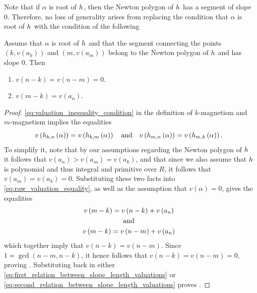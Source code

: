 \documentclass[../main.tex]{subfiles}
\begin{document}
  Note that if $\alpha$ is \aredex root of $h_{}$, then the Newton polygon of $h_{}$ has a segment of slope $0$.
  Therefore, no loss of generality arises from replacing the condition that $\alpha$ is \anex root of $h_{}$ with the condition of the following
  \begin{lemma}
    \label{lem:slope_length_valuation}
    Assume that $\alpha$ is \aredex root of $h_{}$ and that the segment connecting the points $\left( k, v\left( a_k \right) \right)$ and $\left( m, v\left( a_m \right) \right)$ belong to the Newton polygon of $h_{}$ and has slope $0$.
    Then
    \begin{enumerate}
      \item \label{item:smaller_slope_length_valuation} 
      $v\left( n - k \right) = v\left( n - m \right) = 0$.
      \item \label{item:bigger_slope_length_valuation} 
      $v\left( m - k \right) 
        = 
        v\left( a_n \right)
        .$
    \end{enumerate}
  \end{lemma}
  \begin{proof}
    \cref{eq:valuation_inequality_condition} in the definition of $k$-magnetism and $ m $-magnetism implies the equalities 
    \begin{equation}
      \label{eq:raw_valuation_equality}
      v\left( h_{k,n}\left( \alpha \right) \right) = 
      v\left( h_{k,m}\left( \alpha \right) \right)
      \quad \text{and} \quad
      v\left( h_{m,n}\left( \alpha \right) \right) = 
      v\left( h_{m,k}\left( \alpha \right) \right)
      .
    \end{equation}
    To simplify it, note that by our assumptions regarding the Newton polygon of $h_{}$ it follows that $v\left( a_n \right) > v\left( a_m \right) = v\left( a_k \right)$, and that since we also assume that $h_{}$ is \aredex polynomial and thus integral and primitive over $R$, it follows that $v\left( a_m \right) = v\left( a_k \right) = 0$. 
    Substituting these two facts into \cref{eq:raw_valuation_equality}, as well as the assumption that $v\left( \alpha \right) = 0$, gives the equalities
    \begin{gather}
      v\left( m - k \right) = v\left( n - k \right) + v\left( a_n \right) 
      \label{eq:first_relation_between_slope_length_valuations}
      \\
      \notag
      \text{ and } 
      \\
      v\left( m - k \right) = v\left( n - m \right) + v\left( a_n \right) 
      \label{eq:second_relation_between_slope_length_valuations}
    \end{gather}
    which together imply that $v\left( n - k \right) = v\left( n - m \right)$.
    Since $1 = \gcd\left( n - m, n - k \right)$, it hence follows that $v\left( n - k \right) = v\left( n - m \right) = 0$, proving .
    Substituting back in either \cref{eq:first_relation_between_slope_length_valuations} or \cref{eq:second_relation_between_slope_length_valuations} proves .
  \end{proof}
\end{document}
